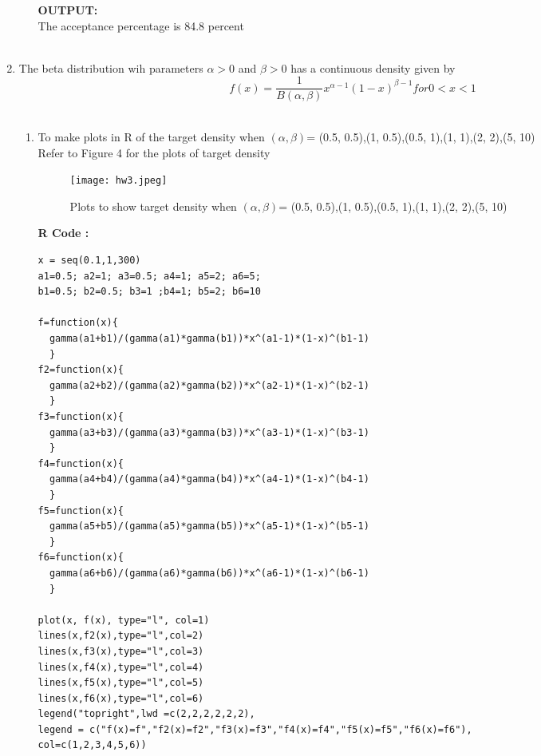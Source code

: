 \documentclass[letterpaper]{article}
\begin{document}
\begin{enumerate}
\begin{enumerate}
 \textbf{ OUTPUT:} \\
The acceptance percentage is 84.8 percent\\\\


\end{enumerate}


\item The beta distribution wih parameters $ \alpha > 0 $ and $\beta >0 $ has a continuous density given by \\
\begin{equation*}
f(x) = \dfrac{1}{B(\alpha , \beta)}x^{\alpha-1}(1-x)^{\beta -1} for 0<x<1
\end{equation*}\\

\begin{enumerate}

\item 
 To make plots in R of the target density when $(\alpha,\beta)$= (0.5, 0.5),(1, 0.5),(0.5, 1),(1, 1),(2, 2),(5, 10)\\
Refer to Figure 4 for the plots of target density\\
\begin{figure}[h]
    \centering
     \texttt{[image: hw3.jpeg]}
      \caption{ Plots to show target density when $(\alpha,\beta)$= (0.5, 0.5),(1, 0.5),(0.5, 1),(1, 1),(2, 2),(5, 10) \label{overflow}}
      \label{Figure 4}
\end{figure}

\textbf {R Code :}\\
\begin{verbatim}
x = seq(0.1,1,300)
a1=0.5; a2=1; a3=0.5; a4=1; a5=2; a6=5;
b1=0.5; b2=0.5; b3=1 ;b4=1; b5=2; b6=10

f=function(x){
  gamma(a1+b1)/(gamma(a1)*gamma(b1))*x^(a1-1)*(1-x)^(b1-1)
  }
f2=function(x){
  gamma(a2+b2)/(gamma(a2)*gamma(b2))*x^(a2-1)*(1-x)^(b2-1)
  }
f3=function(x){
  gamma(a3+b3)/(gamma(a3)*gamma(b3))*x^(a3-1)*(1-x)^(b3-1)
  }
f4=function(x){
  gamma(a4+b4)/(gamma(a4)*gamma(b4))*x^(a4-1)*(1-x)^(b4-1)
  }
f5=function(x){
  gamma(a5+b5)/(gamma(a5)*gamma(b5))*x^(a5-1)*(1-x)^(b5-1)
  }
f6=function(x){
  gamma(a6+b6)/(gamma(a6)*gamma(b6))*x^(a6-1)*(1-x)^(b6-1)
  }

plot(x, f(x), type="l", col=1)
lines(x,f2(x),type="l",col=2)
lines(x,f3(x),type="l",col=3)
lines(x,f4(x),type="l",col=4)
lines(x,f5(x),type="l",col=5)
lines(x,f6(x),type="l",col=6)
legend("topright",lwd =c(2,2,2,2,2,2),
legend = c("f(x)=f","f2(x)=f2","f3(x)=f3","f4(x)=f4","f5(x)=f5","f6(x)=f6"),
col=c(1,2,3,4,5,6))
\end{verbatim}




\end{enumerate}
\end{enumerate}
\end{document}
